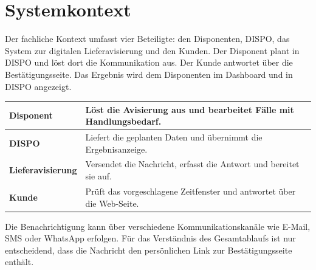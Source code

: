 \clearpage
\section{Systemkontext}

Der fachliche Kontext umfasst vier Beteiligte: den Disponenten, DISPO, das System zur
digitalen Lieferavisierung und den Kunden. Der Disponent plant in DISPO und löst dort die
Kommunikation aus. Der Kunde antwortet über die Bestätigungsseite. Das Ergebnis wird dem
Disponenten im Dashboard und in DISPO angezeigt.



\begin{center}
\begin{tabularx}{0.94\textwidth}{>{\bfseries}L{3.15cm}X}
\hline
Disponent & Löst die Avisierung aus und bearbeitet Fälle mit Handlungsbedarf.\\
\hline
DISPO & Liefert die geplanten Daten und übernimmt die Ergebnisanzeige.\\
\hline
Lieferavisierung & Versendet die Nachricht, erfasst die Antwort und bereitet sie auf.\\
\hline
Kunde & Prüft das vorgeschlagene Zeitfenster und antwortet über die Web-Seite.\\
\hline
\end{tabularx}
\end{center}

Die Benachrichtigung kann über verschiedene Kommunikationskanäle wie E-Mail, SMS oder
WhatsApp erfolgen. Für das Verständnis des Gesamtablaufs ist nur entscheidend, dass die
Nachricht den persönlichen Link zur Bestätigungsseite enthält.
